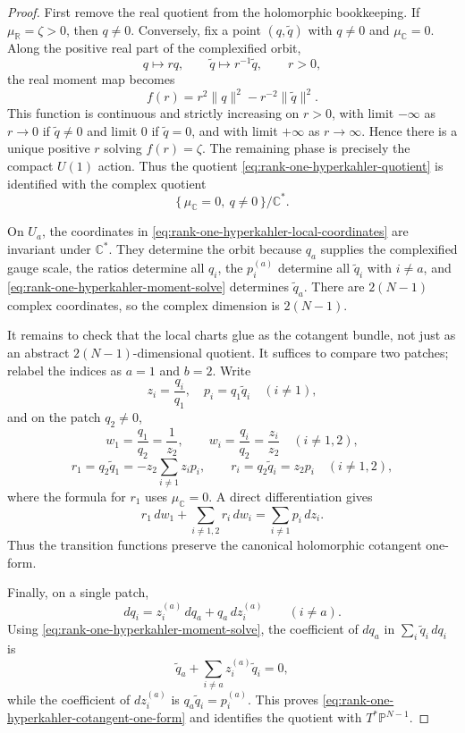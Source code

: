 \begin{proof}
First remove the real quotient from the holomorphic bookkeeping.  If
\(\mu_{\mathbb R}=\zeta>0\), then \(q\neq0\).  Conversely, fix a point
\((q,\widetilde q)\) with \(q\neq0\) and \(\mu_{\mathbb C}=0\).  Along the
positive real part of the complexified orbit,
\[
  q\mapsto rq,\qquad
  \widetilde q\mapsto r^{-1}\widetilde q,\qquad r>0,
\]
the real moment map becomes
\[
  f(r)=r^2\|q\|^2-r^{-2}\|\widetilde q\|^2 .
\]
This function is continuous and strictly increasing on \(r>0\), with limit
\(-\infty\) as \(r\to0\) if \(\widetilde q\neq0\) and limit \(0\) if
\(\widetilde q=0\), and with limit \(+\infty\) as \(r\to\infty\).  Hence
there is a unique positive \(r\) solving \(f(r)=\zeta\).  The remaining phase
is precisely the compact \(U(1)\) action.  Thus the quotient
\eqref{eq:rank-one-hyperkahler-quotient} is identified with the complex
quotient
\begin{equation}
  \{\,\mu_{\mathbb C}=0,\ q\neq0\,\}/\mathbb C^\ast .
  \label{eq:rank-one-hyperkahler-complex-quotient}
\end{equation}

On \(U_a\), the coordinates in
\eqref{eq:rank-one-hyperkahler-local-coordinates} are invariant under
\(\mathbb C^\ast\).  They determine the orbit because \(q_a\) supplies the
complexified gauge scale, the ratios determine all \(q_i\), the \(p_i^{(a)}\)
determine all \(\widetilde q_i\) with \(i\neq a\), and
\eqref{eq:rank-one-hyperkahler-moment-solve} determines
\(\widetilde q_a\).  There are \(2(N-1)\) complex coordinates, so the complex
dimension is \(2(N-1)\).

It remains to check that the local charts glue as the cotangent bundle, not
just as an abstract \(2(N-1)\)-dimensional quotient.  It suffices to compare
two patches; relabel the indices as \(a=1\) and \(b=2\).  Write
\[
  z_i=\frac{q_i}{q_1},\quad p_i=q_1\widetilde q_i
  \quad (i\neq1),
\]
and on the patch \(q_2\neq0\),
\[
  w_1=\frac{q_1}{q_2}=\frac1{z_2},\qquad
  w_i=\frac{q_i}{q_2}=\frac{z_i}{z_2}\quad (i\neq1,2),
\]
\[
  r_1=q_2\widetilde q_1=-z_2\sum_{i\neq1}z_ip_i,
  \qquad
  r_i=q_2\widetilde q_i=z_2p_i\quad (i\neq1,2),
\]
where the formula for \(r_1\) uses \(\mu_{\mathbb C}=0\).  A direct
differentiation gives
\begin{equation}
  r_1\,dw_1+\sum_{i\neq1,2}r_i\,dw_i
  =
  \sum_{i\neq1}p_i\,dz_i .
  \label{eq:rank-one-hyperkahler-one-form-transition}
\end{equation}
Thus the transition functions preserve the canonical holomorphic cotangent
one-form.

Finally, on a single patch,
\[
  dq_i=z_i^{(a)}\,dq_a+q_a\,dz_i^{(a)}\qquad (i\neq a).
\]
Using \eqref{eq:rank-one-hyperkahler-moment-solve}, the coefficient of
\(dq_a\) in \(\sum_i\widetilde q_i\,dq_i\) is
\[
  \widetilde q_a+\sum_{i\neq a}z_i^{(a)}\widetilde q_i=0,
\]
while the coefficient of \(dz_i^{(a)}\) is
\(q_a\widetilde q_i=p_i^{(a)}\).  This proves
\eqref{eq:rank-one-hyperkahler-cotangent-one-form} and identifies the quotient
with \(T^\ast\mathbb P^{N-1}\).
\end{proof}

